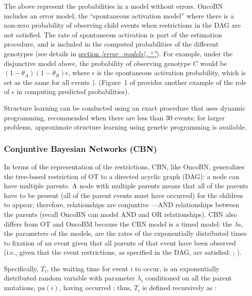 \documentclass[a4paper,11pt]{article}
\newcommand*{\qrefS}[1]{\hyperref[{#1}]{section \textit{\ref*{#1},
      ``\nameref*{#1}''}}}
\begin{document}
The above represent the probabilities in a model without errors. OncoBN includes an error model, the ``spontaneous activation model'' where there is a non-zero probability of observing child events when restrictions in the DAG are not satisfied. The rate of spontaneous activation is part of the estimation procedure, and is included in the computed probabilities of the different genotypes  (see details in \qrefS{error_models}). For example, under the disjunctive model above, the probability of observing genotype $C$ would be $(1 - \theta_A) (1 - \theta_B) \epsilon$, where $\epsilon$ is the spontaneous activation probability, which is set as the same for all events  \citep[p.~5]{nicol2021oncogenetic}). (Figure~1 of \citealp{nicol2021oncogenetic} provides another example of the role of $\epsilon$ in computing predicted probabilities).


Structure learning can be conducted using an exact procedure that uses dynamic programming, recommended when there are less than 30 events; for larger problems, approximate structure learning using genetic programming is available.



\subsubsection{Conjuntive Bayesian Networks (CBN)}\label{cbndetails}

In terms of the representation of the restrictions, CBN, like OncoBN, generalizes the tree-based restriction of OT to a directed acyclic graph (DAG): a node can have multiple parents. A node with multiple parents means that all of the parents have to be present (all of the parent events must have occurred) for the children to appear; therefore, relationships are conjuntive ---AND relationships between the parents (recall OncoBN can model AND and OR relationships). CBN also differs from OT and OncoBM because the CBN model is a timed model: the $\lambda$s, the parameters of the models, are the rates of the exponentially distributed times to fixation of an  event given that all parents of that event have been observed (i.e., given that the event restrictions, as specified in the DAG, are satisfied: \citealp[p. i729]{montazeri2016large}; \citealp[section 2.2]{gerstung2009quantifying}).


Specifically, $T_i$, the waiting time for event $i$ to occur, is an exponentially distributed random variable with parameter $\lambda_i$ conditioned on all the parent mutations, $\mathrm{pa}(i)$, having occurred \citep{gerstung2009quantifying}; thus, $T_i$ is defined recursively as \citep{gerstung2009quantifying, hosseini2019a}:
\end{document}
